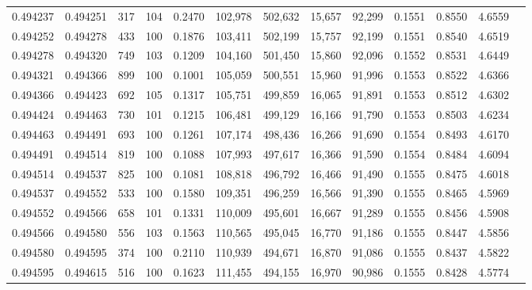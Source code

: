 \begin{tabular}{rrrrrrrrrrrrr}
0.494237 & 0.494251 &   317 & 104 &                                     0.2470 & 102,978 & 502,632 &  15,657 &  92,299 & 0.1551 & 0.8550 & 4.6559 \\
0.494252 & 0.494278 &   433 & 100 &                                     0.1876 & 103,411 & 502,199 &  15,757 &  92,199 & 0.1551 & 0.8540 & 4.6519 \\
0.494278 & 0.494320 &   749 & 103 &                                     0.1209 & 104,160 & 501,450 &  15,860 &  92,096 & 0.1552 & 0.8531 & 4.6449 \\
0.494321 & 0.494366 &   899 & 100 &                                     0.1001 & 105,059 & 500,551 &  15,960 &  91,996 & 0.1553 & 0.8522 & 4.6366 \\
0.494366 & 0.494423 &   692 & 105 &                                     0.1317 & 105,751 & 499,859 &  16,065 &  91,891 & 0.1553 & 0.8512 & 4.6302 \\
0.494424 & 0.494463 &   730 & 101 &                                     0.1215 & 106,481 & 499,129 &  16,166 &  91,790 & 0.1553 & 0.8503 & 4.6234 \\
0.494463 & 0.494491 &   693 & 100 &                                     0.1261 & 107,174 & 498,436 &  16,266 &  91,690 & 0.1554 & 0.8493 & 4.6170 \\
0.494491 & 0.494514 &   819 & 100 &                                     0.1088 & 107,993 & 497,617 &  16,366 &  91,590 & 0.1554 & 0.8484 & 4.6094 \\
0.494514 & 0.494537 &   825 & 100 &                                     0.1081 & 108,818 & 496,792 &  16,466 &  91,490 & 0.1555 & 0.8475 & 4.6018 \\
0.494537 & 0.494552 &   533 & 100 &                                     0.1580 & 109,351 & 496,259 &  16,566 &  91,390 & 0.1555 & 0.8465 & 4.5969 \\
0.494552 & 0.494566 &   658 & 101 &                                     0.1331 & 110,009 & 495,601 &  16,667 &  91,289 & 0.1555 & 0.8456 & 4.5908 \\
0.494566 & 0.494580 &   556 & 103 &                                     0.1563 & 110,565 & 495,045 &  16,770 &  91,186 & 0.1555 & 0.8447 & 4.5856 \\
0.494580 & 0.494595 &   374 & 100 &                                     0.2110 & 110,939 & 494,671 &  16,870 &  91,086 & 0.1555 & 0.8437 & 4.5822 \\
0.494595 & 0.494615 &   516 & 100 &                                     0.1623 & 111,455 & 494,155 &  16,970 &  90,986 & 0.1555 & 0.8428 & 4.5774 \\

\end{tabular}
